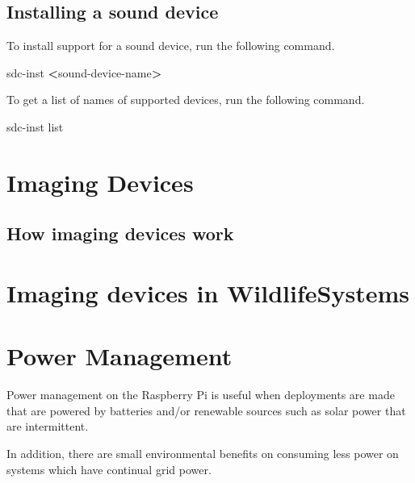 \documentclass[
]{book}
\newenvironment{Shaded}{\begin{snugshade}}{\end{snugshade}}
\newcommand{\ExtensionTok}[1]{#1}
\newcommand{\NormalTok}[1]{#1}
\newcommand{\OperatorTok}[1]{\textcolor[rgb]{0.81,0.36,0.00}{\textbf{#1}}}
\begin{document}
\section{Installing a sound device}\label{installing-a-sound-device}

To install support for a sound device, run the following command.

\begin{Shaded}
\begin{Highlighting}[]
\ExtensionTok{sdc{-}inst} \OperatorTok{\textless{}}\NormalTok{sound{-}device{-}name}\OperatorTok{\textgreater{}}
\end{Highlighting}
\end{Shaded}

To get a list of names of supported devices, run the following command.

\begin{Shaded}
\begin{Highlighting}[]
\ExtensionTok{sdc{-}inst}\NormalTok{ list}
\end{Highlighting}
\end{Shaded}

\chapter{Imaging Devices}\label{imaging-devices}

\section{How imaging devices work}\label{how-imaging-devices-work}

\chapter{Imaging devices in WildlifeSystems}\label{imaging-devices-in-wildlifesystems}

\chapter{Power Management}\label{power-management}

Power management on the Raspberry Pi is useful when deployments are made that are powered by batteries and/or renewable sources such as solar power that are intermittent.

In addition, there are small environmental benefits on consuming less power on systems which have continual grid power.
\end{document}
